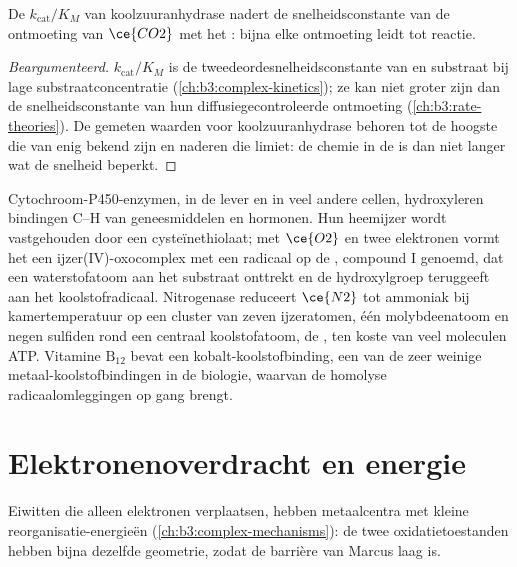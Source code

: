 \begin{proposition}\label{prop:b3:bioinorganic:carbonic-anhydrase}
De  $k_{\mathrm{cat}}/K_M$ van koolzuuranhydrase nadert de
snelheidsconstante van de ontmoeting van $\ce{CO2}$ met het : bijna elke ontmoeting leidt tot
reactie.
\end{proposition}

\begin{proof}[Beargumenteerd]
$k_{\mathrm{cat}}/K_M$ is de tweedeordesnelheidsconstante van  en substraat bij lage
substraatconcentratie (\cref{ch:b3:complex-kinetics}); ze kan niet groter
zijn dan de snelheidsconstante van hun diffusiegecontroleerde ontmoeting
(\cref{ch:b3:rate-theories}). De gemeten waarden voor koolzuuranhydrase
behoren tot de hoogste die van enig  bekend zijn en naderen die
limiet: de chemie in de  is dan niet langer wat de snelheid
beperkt.
\end{proof}

Cytochroom-P450-enzymen, in de lever en in veel andere cellen,
hydroxyleren bindingen C--H van geneesmiddelen en hormonen. Hun heemijzer wordt vastgehouden door een
cysteïnethiolaat; met
$\ce{O2}$ en twee elektronen vormt het een ijzer(IV)-oxocomplex met een radicaal op de
, compound I genoemd, dat een waterstofatoom aan het substraat
onttrekt en de hydroxylgroep teruggeeft aan het koolstofradicaal.
Nitrogenase reduceert $\ce{N2}$ tot ammoniak bij kamertemperatuur op een cluster van zeven ijzeratomen,
één molybdeenatoom en negen sulfiden rond een centraal koolstofatoom, de
, ten koste van veel moleculen ATP. Vitamine $\mathrm{B_{12}}$ bevat een
kobalt-koolstofbinding, een van de zeer weinige metaal-koolstofbindingen
in de biologie, waarvan de homolyse radicaalomleggingen op gang brengt.

\section{Elektronenoverdracht en energie}

Eiwitten die alleen elektronen verplaatsen, hebben metaalcentra met
kleine reorganisatie-energieën (\cref{ch:b3:complex-mechanisms}): de twee
oxidatietoestanden hebben bijna dezelfde geometrie, zodat de barrière van
Marcus laag is.

